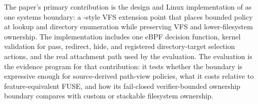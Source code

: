 The paper's primary contribution is the design and Linux implementation of
\namei as one systems boundary: a -style VFS extension point
that places bounded policy at lookup and directory enumeration while preserving
VFS and lower-filesystem ownership. The implementation includes one eBPF
decision function, kernel validation for pass, redirect, hide, and registered
directory-target selection actions, and the real 
attachment path used by the evaluation. The evaluation is the evidence program
for that contribution: it tests whether the boundary is expressive enough for
source-derived path-view policies, what it costs relative to feature-equivalent
FUSE, and how its fail-closed verifier-bounded ownership boundary compares with
custom or stackable filesystem ownership.
